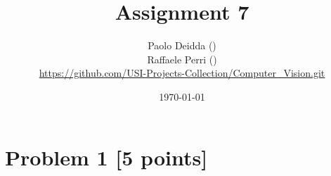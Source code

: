 \documentclass[12pt]{article}
\author{
	Paolo Deidda (\text{paolo.deidda@usi.ch}) \\ 
    Raffaele Perri (\text{raffaele.perri@usi.ch}) \\
    \url{https://github.com/USI-Projects-Collection/Computer_Vision.git}
}
\date{\today}
\begin{document}
\title{Assignment 7}
\maketitle

\section*{Problem 1 [5 points]}


% 

% 
\end{document}
